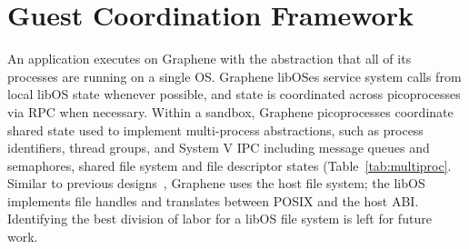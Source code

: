\section{Guest Coordination Framework}
\label{sec:namespaces}



An application executes on Graphene 
with the abstraction that all of its processes are running on a single OS.
Graphene libOSes service system calls
from local libOS state whenever possible,
and state is coordinated across picoprocesses via RPC when necessary.
Within a sandbox, Graphene picoprocesses 
coordinate shared state used to implement multi-process
abstractions, such as process identifiers, thread groups, and 
System V IPC including message queues and semaphores, shared file system and file descriptor states (Table~\ref{tab:multiproc}.
Similar to previous designs~\cite{porter11drawbridge,baumann13bascule}, 
Graphene uses the host file system; 
the libOS implements file handles and translates between POSIX and the host ABI.
Identifying the best division of labor for a libOS file system is 
left for future work.

